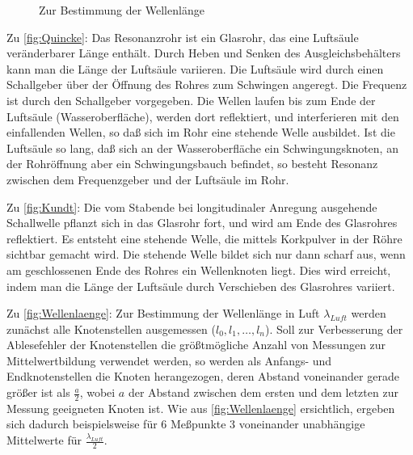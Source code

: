 \documentclass[11pt]{scrartcl}
\begin{document}
\begin{figure}[H]
\begin{center}
\begin{minipage}[t]{.51\linewidth}
            \caption{Zur Bestimmung der Wellenlänge}
            \label{fig:Wellenlaenge}
        \end{minipage}
    \end{center}
\end{figure}

Zu \autoref{fig:Quincke}: Das Resonanzrohr ist ein Glasrohr, das eine Luftsäule veränderbarer Länge enthält.
Durch Heben und Senken des Ausgleichsbehälters kann man die Länge der Luftsäule variieren.
Die Luftsäule wird durch einen Schallgeber über der Öffnung des Rohres zum Schwingen angeregt.
Die Frequenz ist durch den Schallgeber vorgegeben. Die Wellen laufen bis zum Ende
der Luftsäule (Wasseroberfläche), werden dort reflektiert, und interferieren mit den einfallenden
Wellen, so daß sich im Rohr eine stehende Welle ausbildet. Ist die Luftsäule so lang, daß sich an
der Wasseroberfläche ein Schwingungsknoten, an der Rohröffnung aber ein Schwingungsbauch
befindet, so besteht Resonanz zwischen dem Frequenzgeber und der Luftsäule im Rohr.

Zu \autoref{fig:Kundt}: Die vom Stabende bei longitudinaler Anregung ausgehende Schallwelle pflanzt sich
in das Glasrohr fort, und wird am Ende des Glasrohres reflektiert. Es entsteht eine stehende
Welle, die mittels Korkpulver in der Röhre sichtbar gemacht wird. Die stehende Welle bildet
sich nur dann scharf aus, wenn am geschlossenen Ende des Rohres ein Wellenknoten liegt. Dies
wird erreicht, indem man die Länge der Luftsäule durch Verschieben des Glasrohres variiert.

Zu \autoref{fig:Wellenlaenge}: Zur Bestimmung der Wellenlänge in Luft $\lambda_{Luft}$ werden zunächst alle Knotenstellen
ausgemessen ($l_0,l_1,\dots,l_n$). Soll zur Verbesserung der Ablesefehler der Knotenstellen die
größtmögliche Anzahl von Messungen zur Mittelwertbildung verwendet werden, so werden als
Anfangs- und Endknotenstellen die Knoten herangezogen, deren Abstand voneinander gerade
größer ist als $\frac{a}{2}$, wobei $a$ der Abstand zwischen dem ersten und dem letzten zur Messung
geeigneten Knoten ist. Wie aus \autoref{fig:Wellenlaenge} ersichtlich, ergeben sich dadurch beispielsweise für 6
Meßpunkte 3 voneinander unabhängige Mittelwerte für $\frac{\lambda_{Luft}}{2}$.
\end{document}
